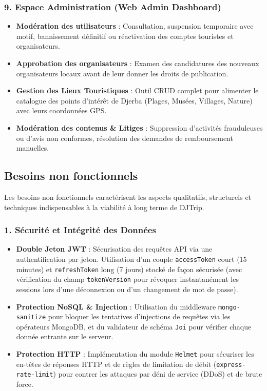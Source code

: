 \documentclass[12pt,a4paper]{report}
\begin{document}
\subsubsection{9. Espace Administration (Web Admin Dashboard)}
\begin{itemize}[label=\textbullet]
    \item \textbf{Modération des utilisateurs} : Consultation, suspension temporaire avec motif, bannissement définitif ou réactivation des comptes touristes et organisateurs.
    \item \textbf{Approbation des organisateurs} : Examen des candidatures des nouveaux organisateurs locaux avant de leur donner les droits de publication.
    \item \textbf{Gestion des Lieux Touristiques} : Outil CRUD complet pour alimenter le catalogue des points d'intérêt de Djerba (Plages, Musées, Villages, Nature) avec leurs coordonnées GPS.
    \item \textbf{Modération des contenus \& Litiges} : Suppression d'activités frauduleuses ou d'avis non conformes, résolution des demandes de remboursement manuelles.
\end{itemize}

\subsection{Besoins non fonctionnels}
Les besoins non fonctionnels caractérisent les aspects qualitatifs, structurels et techniques indispensables à la viabilité à long terme de DJTrip.

\subsubsection{1. Sécurité et Intégrité des Données}
\begin{itemize}[label=\textbullet]
    \item \textbf{Double Jeton JWT} : Sécurisation des requêtes API via une authentification par jeton. Utilisation d'un couple \texttt{accessToken} court (15 minutes) et \texttt{refreshToken} long (7 jours) stocké de façon sécurisée (avec vérification du champ \texttt{tokenVersion} pour révoquer instantanément les sessions lors d'une déconnexion ou d'un changement de mot de passe).
    \item \textbf{Protection NoSQL \& Injection} : Utilisation du middleware \texttt{mongo-sanitize} pour bloquer les tentatives d'injections de requêtes via les opérateurs MongoDB, et du validateur de schéma \texttt{Joi} pour vérifier chaque donnée entrante sur le serveur.
    \item \textbf{Protection HTTP} : Implémentation du module \texttt{Helmet} pour sécuriser les en-têtes de réponses HTTP et de règles de limitation de débit (\texttt{express-rate-limit}) pour contrer les attaques par déni de service (DDoS) et de brute force.
\end{itemize}
\end{document}
